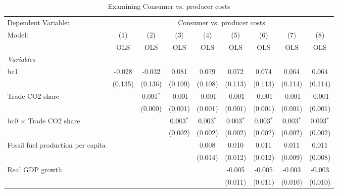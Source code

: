 
\begin{table}[htbp]
   \caption{Examining Consumer vs. producer costs}
   \centering
   \begin{tabular}{lcccccccc}
      \toprule
      Dependent Variable: & \multicolumn{8}{c}{Consumer vs. producer costs}\\
      Model:                                  & (1)     & (2)         & (3)         & (4)         & (5)         & (6)         & (7)         & (8)\\  
                                              &  OLS    & OLS         & OLS         & OLS         & OLS         & OLS         & OLS         & OLS\\  
      \midrule
      \emph{Variables}\\
      bc1                                     & -0.028  & -0.032      & 0.081       & 0.079       & 0.072       & 0.074       & 0.064       & 0.064\\   
                                              & (0.135) & (0.136)     & (0.109)     & (0.108)     & (0.113)     & (0.113)     & (0.114)     & (0.114)\\   
      Trade CO2 share                         &         & 0.001$^{*}$ & -0.001      & -0.001      & -0.001      & -0.001      & -0.001      & -0.001\\   
                                              &         & (0.000)     & (0.001)     & (0.001)     & (0.001)     & (0.001)     & (0.001)     & (0.001)\\   
      bc0 $\times$ Trade CO2 share            &         &             & 0.003$^{*}$ & 0.003$^{*}$ & 0.003$^{*}$ & 0.003$^{*}$ & 0.003$^{*}$ & 0.003$^{*}$\\   
                                              &         &             & (0.002)     & (0.002)     & (0.002)     & (0.002)     & (0.002)     & (0.002)\\   
      Fossil fuel production per capita       &         &             &             & 0.008       & 0.010       & 0.011       & 0.011       & 0.011\\   
                                              &         &             &             & (0.014)     & (0.012)     & (0.012)     & (0.009)     & (0.008)\\   
      Real GDP growth                         &         &             &             &             & -0.005      & -0.005      & -0.003      & -0.003\\   
                                              &         &             &             &             & (0.011)     & (0.011)     & (0.010)     & (0.010)\\   

\end{tabular}
\end{table}
